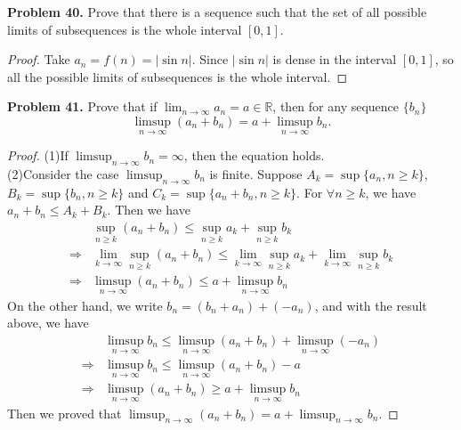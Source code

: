 \documentclass[12pt,leqno]{amsart}
\begin{document}
\medskip

\noindent
{\bf Problem 40.}
Prove that there is a sequence such that the set of all possible limits of subsequences is the whole interval $[0,1]$.
\begin{proof}
Take $a_n = f(n) = |\sin n|$. Since $|\sin n|$ is dense in the interval $[0,1]$, so all the possible limits of subsequences is the whole interval.
\end{proof}

\medskip

\noindent
{\bf Problem 41.}
Prove that if $\displaystyle\lim_{n\to\infty} a_n=a\in\mathbb{R}$, then for any sequence $\{ b_n\}$
$$
\limsup_{n\to\infty} (a_n+b_n)= a+\limsup_{n\to\infty} b_n.
$$
\begin{proof}
(1)If $\limsup_{n\to\infty}b_n = \infty$, then the equation holds. \\
\hspace*{3em}(2)Consider the case $\limsup_{n\to\infty}b_n$ is finite. Suppose $A_k=\sup\{a_n,n\geq k\}$, $B_k=\sup\{b_n,n\geq k\}$ and $C_k=\sup\{a_n+b_n,n\geq k\}$. For $\forall n\geq k$, we have $a_n+b_n\leq A_k+B_k$. Then we have 
\begin{align*}
    &\sup_{n\geq k}(a_n+b_n)\leq \sup_{n\geq k} a_k + \sup_{n\geq k} b_k \\
    \Rightarrow & \lim_{k\to\infty}\sup_{n\geq k}(a_n+b_n)\leq \lim_{k\to\infty}\sup_{n\geq k} a_k + \lim_{k\to\infty}\sup_{n\geq k} b_k \\
    \Rightarrow & \limsup_{n\to\infty}(a_n+b_n) \leq a + \limsup_{n\to\infty} b_n
\end{align*}
On the other hand, we write $b_n=(b_n+a_n)+(-a_n)$, and with the result above, we have
\begin{align*}
    &\limsup_{n\to\infty}b_n \leq \limsup_{n\to\infty}(a_n+b_n) + \limsup_{n\to\infty}(-a_n) \\
    \Rightarrow & \limsup_{n\to\infty}b_n \leq \limsup_{n\to\infty}(a_n+b_n) - a\\
    \Rightarrow & \limsup_{n\to\infty}(a_n+b_n) \geq a +\limsup_{n\to\infty}b_n
\end{align*}
Then we proved that $\limsup_{n\to\infty} (a_n+b_n)= a+\limsup_{n\to\infty} b_n$.
\end{proof}

\medskip
\end{document}
